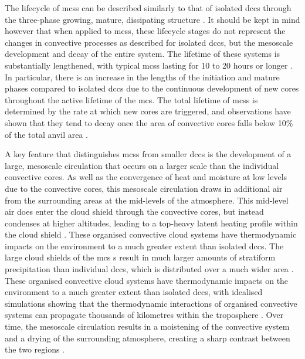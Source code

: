 The lifecycle of \acrshort{mcs}s can be described similarly to that of isolated \acrshort{dcc}s through the three-phase growing, mature, dissipating structure \citep{futyan_deep_2007}.
It should be kept in mind however that when applied to \acrshort{mcs}s, these lifecycle stages do not represent the changes in convective processes as described for isolated \acrshort{dcc}s, but the mesoscale development and decay of the entire system.
The lifetime of these systems is substantially lengthened, with typical \acrshort{mcs}s lasting for 10 to 20 hours or longer \citep{chen_diurnal_1997}.
In particular, there is an increase in the lengths of the initiation and mature phases compared to isolated \acrshort{dcc}s \citep{wall_life_2018} due to the continuous development of new cores throughout the active lifetime of the \acrshort{mcs}.
The total lifetime of \acrshort{mcs}s is determined by the rate at which new cores are triggered, and observations have shown that they tend to decay once the area of convective cores falls below 10\% of the total anvil area \citep{elsaesser_simple_2022}.

A key feature that distinguishes \acrshort{mcs}s from smaller \acrshort{dcc}s is the development of a large, mesoscale circulation that occurs on a larger scale than the individual convective cores.
As well as the convergence of heat and moisture at low levels due to the convective cores, this mesoscale circulation draws in additional air from the surrounding areas at the mid-levels of the atmosphere.
This mid-level air does enter the cloud shield through the convective cores, but instead condenses at higher altitudes, leading to a top-heavy latent heating profile within the cloud shield \citep{schumacher_tropical_2004}.
These organised convective cloud systems have thermodynamic impacts on the environment to a much greater extent than isolated \acrshort{dcc}s.
The large cloud shields of the \acrshort{mcs} s result in much larger amounts of stratiform precipitation than individual \acrshort{dcc}s, which is distributed over a much wider area \citep{houze_chapter_2014}.
These organised convective cloud systems have thermodynamic impacts on the environment to a much greater extent than isolated \acrshort{dcc}s, with idealised simulations showing that the thermodynamic interactions of organised convective systems can propagate thousands of kilometres within the troposphere \citep{beucler_budget_2019}.
Over time, the mesoscale circulation results in a moistening of the convective system and a drying of the surrounding atmosphere, creating a sharp contrast between the two regions \citep{bretherton_energybalance_2005}.

